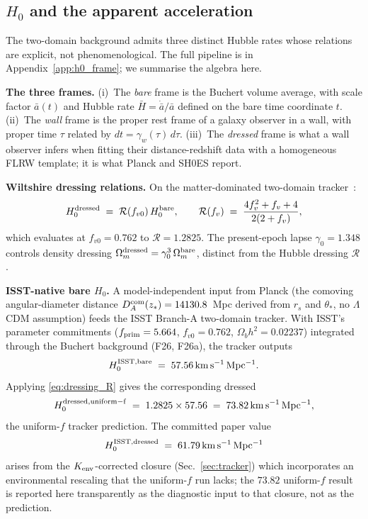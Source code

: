 \documentclass[aps,prd,twocolumn,nofootinbib,floatfix,superscriptaddress]{revtex4-2}
\begin{document}
\subsection{$H_0$ and the apparent acceleration}
\label{sec:hubble}

The two-domain background admits three distinct Hubble rates whose
relations are explicit, not phenomenological. The full pipeline is
in Appendix~\ref{app:h0_frame}; we summarise the algebra here.

\textbf{The three frames.}
(i)~The \emph{bare} frame is the Buchert volume average, with scale
factor $\bar a(t)$ and Hubble rate $\bar H = \dot{\bar a}/\bar a$
defined on the bare time coordinate $t$.
(ii)~The \emph{wall} frame is the proper rest frame of a galaxy
observer in a wall, with proper time $\tau$ related by
$dt = \gamma_w(\tau)\,d\tau$.
(iii)~The \emph{dressed} frame is what a wall observer infers when
fitting their distance-redshift data with a homogeneous FLRW
template; it is what Planck and SH0ES report.

\textbf{Wiltshire dressing relations.} On the matter-dominated
two-domain tracker~\cite{Wiltshire2007,Wiltshire2009}:
\begin{equation}
\label{eq:dressing_R}
H_0^{\rm dressed} \;=\; \mathcal{R}(f_{v0})\,H_0^{\rm bare},
\qquad
\mathcal{R}(f_v) \;=\; \frac{4f_v^2 + f_v + 4}{2(2+f_v)},
\end{equation}
which evaluates at $f_{v0} = 0.762$ to $\mathcal{R} = 1.2825$. The
present-epoch lapse $\gamma_0 = 1.348$ controls density dressing
$\Omega_m^{\rm dressed} = \gamma_0^3\,\Omega_m^{\rm bare}$, distinct
from the Hubble dressing $\mathcal{R}$.

\textbf{ISST-native bare $H_0$.} A model-independent input from
Planck (the comoving angular-diameter distance $D_A^{\rm com}(z_*) =
14130.8$~Mpc derived from $r_s$ and $\theta_*$, no $\Lambda$CDM
assumption) feeds the ISST Branch-A two-domain tracker. With ISST's
parameter commitments ($f_{\rm prim} = 5.664$, $f_{v0} = 0.762$,
$\Omega_b h^2 = 0.02237$) integrated through the Buchert background
(F26, F26a), the tracker outputs
\begin{equation}
\label{eq:bare_h0}
H_0^{\rm ISST,bare} \;=\; 57.56\,{\rm km\,s^{-1}\,Mpc^{-1}}.
\end{equation}
Applying \eqref{eq:dressing_R} gives the corresponding dressed
\begin{equation}
\label{eq:dressed_uniform}
H_0^{\rm dressed,uniform-f} \;=\; 1.2825 \times 57.56 \;=\;
73.82\,{\rm km\,s^{-1}\,Mpc^{-1}},
\end{equation}
the uniform-$f$ tracker prediction. The committed paper value
\begin{equation}
\label{eq:H0_committed}
H_0^{\rm ISST,dressed} \;=\; 61.79\,{\rm km\,s^{-1}\,Mpc^{-1}}
\end{equation}
arises from the $K_{\rm env}$-corrected closure
(Sec.~\ref{sec:tracker}) which incorporates an environmental
rescaling that the uniform-$f$ run lacks; the $73.82$ uniform-$f$
result is reported here transparently as the diagnostic input to
that closure, not as the prediction.
\end{document}
